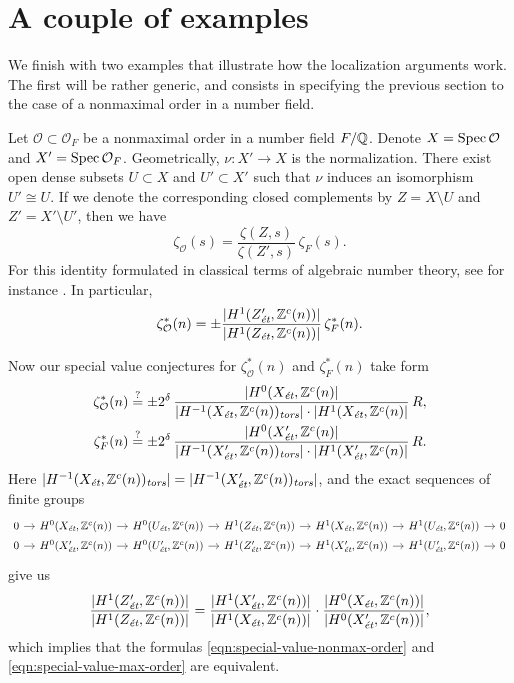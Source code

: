 \documentclass{article}
\numberwithin{equation}{section}
\begin{document}

\section{A couple of examples}
\label{sec:examples}

We finish with two examples that illustrate how the localization arguments
work. The first will be rather generic, and consists in specifying the previous
section to the case of a nonmaximal order in a number field.

\begin{example}
  Let $\mathcal{O} \subset \mathcal{O}_F$ be a nonmaximal order in a number
  field $F/\QQ$. Denote $X = \Spec \mathcal{O}$ and
  $X' = \Spec \mathcal{O}_F$. Geometrically, $\nu\colon X' \to X$ is the
  normalization. There exist open dense subsets $U \subset X$ and
  $U' \subset X'$ such that $\nu$ induces an isomorphism $U' \cong U$. If we
  denote the corresponding closed complements by $Z = X\setminus U$ and
  $Z' = X'\setminus U'$, then we have
  $$\zeta_\mathcal{O} (s) = \frac{\zeta (Z,s)}{\zeta (Z',s)}\,\zeta_F (s).$$
  For this identity formulated in classical terms of algebraic number theory,
  see for instance \cite{Jenner-1969}. In particular,
  \[ \zeta^*_\mathcal{O} (n) =
    \pm \frac{|H^1 (Z'_\et, \ZZ^c(n))|}{|H^1 (Z_\et, \ZZ^c(n))|}\,\zeta^*_F (n). \]

  Now our special value conjectures for $\zeta^*_\mathcal{O} (n)$ and
  $\zeta^*_F (n)$ take form
  \begin{align}
    \label{eqn:special-value-nonmax-order}
    \zeta^*_\mathcal{O} (n) & \stackrel{?}{=}
                              \pm 2^\delta\,\frac{|H^0 (X_\et, \ZZ^c (n)|}{|H^{-1} (X_\et, \ZZ^c (n))_\tors|\cdot |H^1 (X_\et, \ZZ^c (n)|}\,R, \\
    \label{eqn:special-value-max-order}
    \zeta^*_F (n) & \stackrel{?}{=}
                    \pm 2^\delta\,\frac{|H^0 (X'_\et, \ZZ^c (n)|}{|H^{-1} (X'_\et, \ZZ^c (n))_\tors|\cdot |H^1 (X'_\et, \ZZ^c (n)|}\,R.
  \end{align}
  Here
  $|H^{-1} (X_\et, \ZZ^c (n))_\tors| = |H^{-1} (X'_\et, \ZZ^c (n))_\tors|$, and
  the exact sequences of finite groups
  \[ \begin{tikzcd}[row sep=0pt, column sep=1em]
      0 \ar{r} & H^0 (X_\et, \ZZ^c (n)) \ar{r} & H^0 (U_\et, \ZZ^c (n)) \ar{r} & H^1 (Z_\et, \ZZ^c (n)) \ar{r} & H^1 (X_\et, \ZZ^c (n)) \ar{r} & H^1 (U_\et, \ZZ^c (n)) \ar{r} & 0 \\
      0 \ar{r} & H^0 (X'_\et, \ZZ^c (n)) \ar{r} & H^0 (U'_\et, \ZZ^c (n)) \ar{r} & H^1 (Z'_\et, \ZZ^c (n)) \ar{r} & H^1 (X'_\et, \ZZ^c (n)) \ar{r} & H^1 (U'_\et, \ZZ^c (n)) \ar{r} & 0
    \end{tikzcd} \]
  give us
  \[ \frac{|H^1 (Z'_\et, \ZZ^c (n))|}{|H^1 (Z_\et, \ZZ^c (n))|} =
    \frac{|H^1 (X'_\et, \ZZ^c (n))|}{|H^1 (X_\et, \ZZ^c (n))|}\cdot
    \frac{|H^0 (X_\et, \ZZ^c (n))|}{|H^0 (X'_\et, \ZZ^c (n))|}, \]
  which implies that the formulas \eqref{eqn:special-value-nonmax-order} and
  \eqref{eqn:special-value-max-order} are equivalent.
\end{example}
\end{document}
